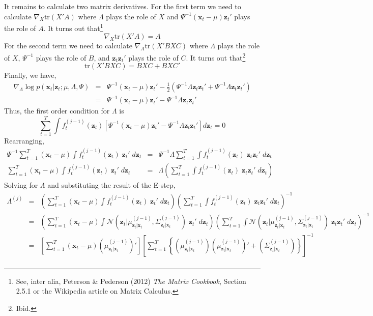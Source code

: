 It remains to calculate two matrix derivatives. For the first term we need to calculate $\nabla_X \mbox{tr}(X'A)$ where $\Lambda$ plays the role of $X$ and $\Psi^{-1}(\mathbf{x}_t - \mu)\mathbf{z}_t'$ plays the role of $A$. It turns out that\footnote{See, inter alia, Peterson \& Pederson (2012) \emph{The Matrix Cookbook}, Section 2.5.1 or the Wikipedia article on Matrix Calculus.} 
	$$\nabla_X \mbox{tr}(X'A)  = A$$
For the second term we need to calculate $\nabla_A \mbox{tr}(X'BXC)$ where $\Lambda$ plays the role of $X$, $\Psi^{-1}$ plays the role of $B$, and $\mathbf{z}_t \mathbf{z}_t'$ plays the role of $C$. It turns out that\footnote{Ibid.}
	$$\mbox{tr}(X'BXC) = BXC + BXC'$$
Finally, we have,
	\begin{eqnarray*}
		\nabla_\Lambda \log p(\textbf{x}_t| \textbf{z}_t;\mu, \Lambda, \Psi) &=& \Psi^{-1} (\textbf{x}_t - \mu)\textbf{z}_t' - \frac{1}{2} \left(\Psi^{-1}\Lambda \textbf{z}_t \textbf{z}_t' +  \Psi^{-1}\Lambda \textbf{z}_t \textbf{z}_t'\right)\\
		&=&\Psi^{-1} (\textbf{x}_t - \mu)\textbf{z}_t' - \Psi^{-1}\Lambda \textbf{z}_t \textbf{z}_t' 
	\end{eqnarray*}
Thus, the first order condition for $\Lambda$ is
$$\sum_{t = 1}^T \int f_t^{(j-1)}(\mathbf{z}_t) \left[ \Psi^{-1} (\textbf{x}_t - \mu)\textbf{z}_t' - \Psi^{-1}\Lambda \textbf{z}_t \textbf{z}_t' \right] d \mathbf{z}_t = 0$$
Rearranging,
	\begin{eqnarray*}
		 \Psi^{-1} \sum_{t = 1}^T  (\textbf{x}_t - \mu)\int f_t^{(j-1)}(\mathbf{z}_t) \; \textbf{z}_t' \; d \mathbf{z}_t &=&  \Psi^{-1} \Lambda \sum_{t=1}^T \int f_t^{(j-1)}(\mathbf{z}_t)\; \textbf{z}_t \textbf{z}_t' \; d \mathbf{z}_t\\
		  \sum_{t = 1}^T  (\textbf{x}_t - \mu)\int f_t^{(j-1)}(\mathbf{z}_t) \; \textbf{z}_t' \; d \mathbf{z}_t &=& \Lambda \left(\sum_{t=1}^T \int f_t^{(j-1)}(\mathbf{z}_t)\; \textbf{z}_t \textbf{z}_t' \; d \mathbf{z}_t\right)
	\end{eqnarray*}
Solving for $\Lambda$ and substituting the result of the E-step,
	\begin{eqnarray*}
		\Lambda^{(j)} &=& \left(\sum_{t = 1}^T  (\textbf{x}_t - \mu)\int f_t^{(j-1)}(\mathbf{z}_t) \; \textbf{z}_t' \; d \mathbf{z}_t\right) \left(\sum_{t=1}^T \int f_t^{(j-1)}(\mathbf{z}_t)\; \textbf{z}_t \textbf{z}_t' \; d \mathbf{z}_t\right)^{-1}\\
			&=&\left(\sum_{t = 1}^T  (\textbf{x}_t - \mu)\int \mathcal{N}\left(\mathbf{z}_t|\mu^{(j-1)}_{\mathbf{z}_t|\mathbf{x}_t}, \Sigma^{(j-1)}_{\mathbf{z}_t|\mathbf{x}_t}\right) \; \textbf{z}_t' \; d \mathbf{z}_t\right) \left(\sum_{t=1}^T \int \mathcal{N}\left(\mathbf{z}_t|\mu^{(j-1)}_{\mathbf{z}_t|\mathbf{x}_t}, \Sigma^{(j-1)}_{\mathbf{z}_t|\mathbf{x}_t}\right)\; \textbf{z}_t \textbf{z}_t' \; d \mathbf{z}_t\right)^{-1}\\
			&=& \left[\sum_{t=1}^T (\mathbf{x}_t - \mu)\left(\mu^{(j-1)}_{\mathbf{z}_t|\mathbf{x}_t} \right)'\right]\left[\sum_{t=1}^T \left\{ \left(\mu^{(j-1)}_{\mathbf{z}_t|\mathbf{x}_t} \right)\left(\mu^{(j-1)}_{\mathbf{z}_t|\mathbf{x}_t} \right)' + \left(\Sigma^{(j-1)}_{\mathbf{z}_t|\mathbf{x}_t} \right) \right\}  \right]^{-1}\\
	\end{eqnarray*}
